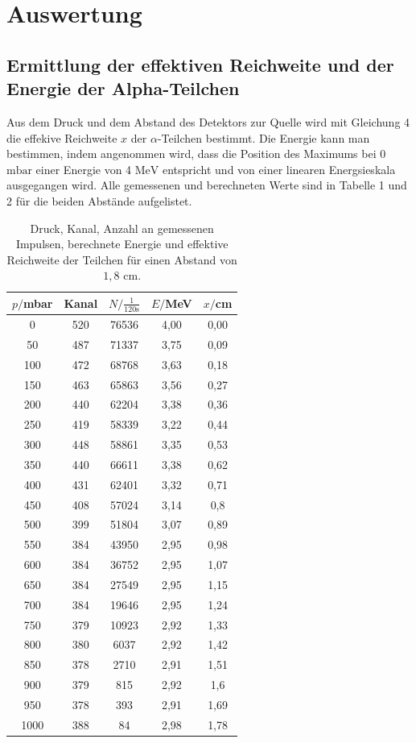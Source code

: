 \section{Auswertung}
\label{sec:Auswertung}

\subsection{Ermittlung der effektiven Reichweite und der Energie der Alpha-Teilchen}
Aus dem Druck und dem Abstand des Detektors zur Quelle wird mit Gleichung 4 die effekive Reichweite $x$ der $\alpha$-Teilchen bestimmt. 
Die Energie kann man bestimmen, indem angenommen wird, dass die Position des Maximums bei $0$ $\si{\milli\bar}$ einer Energie von 4 $\si{\MeV}$ entspricht und von einer linearen Energsieskala ausgegangen wird.
Alle gemessenen und berechneten Werte sind in Tabelle 1 und 2 für die beiden Abstände aufgelistet.


\begin{table}[H]
  \centering
  \caption{Druck, Kanal, Anzahl an gemessenen Impulsen, berechnete Energie und effektive Reichweite der Teilchen für einen Abstand von $1,8$ $\si{\cm}$.}
  \label{tab:Parameter}
  \begin{tabular}{c c c c c}
    \toprule
    $p/$mbar& Kanal & $N/\frac{1}{120\si{\second}}$ & $E/$MeV & $x/$cm \\
    \bottomrule
    0 & 520 & 76536 & 4,00 & 0,00 \\
    50 & 487 & 71337 & 3,75 & 0,09 \\
    100 & 472 & 68768 & 3,63 & 0,18 \\
    150 & 463 & 65863 & 3,56 & 0,27 \\
    200 & 440 & 62204 & 3,38 & 0,36 \\
    250 & 419 & 58339 & 3,22 & 0,44 \\
    300 & 448 & 58861 & 3,35 & 0,53 \\
    350 & 440 & 66611 & 3,38 & 0,62 \\
    400 & 431 & 62401 & 3,32 & 0,71 \\
    450 & 408 & 57024 & 3,14 & 0,8 \\
    500 & 399 & 51804 & 3,07 & 0,89 \\
    550 & 384 & 43950 & 2,95 & 0,98 \\
    600 & 384 & 36752 & 2,95 & 1,07 \\
    650 & 384 & 27549 & 2,95 & 1,15 \\
    700 & 384 & 19646 & 2,95 & 1,24 \\
    750 & 379 & 10923 & 2,92 & 1,33 \\
    800 & 380 & 6037 & 2,92 & 1,42 \\
    850 & 378 & 2710 & 2,91 & 1,51 \\
    900 & 379 & 815 & 2,92 & 1,6 \\
    950 & 378 & 393 & 2,91 & 1,69 \\
    1000 & 388 & 84 & 2,98 & 1,78 \\
 
     \bottomrule
  \end{tabular}
\end{table}

